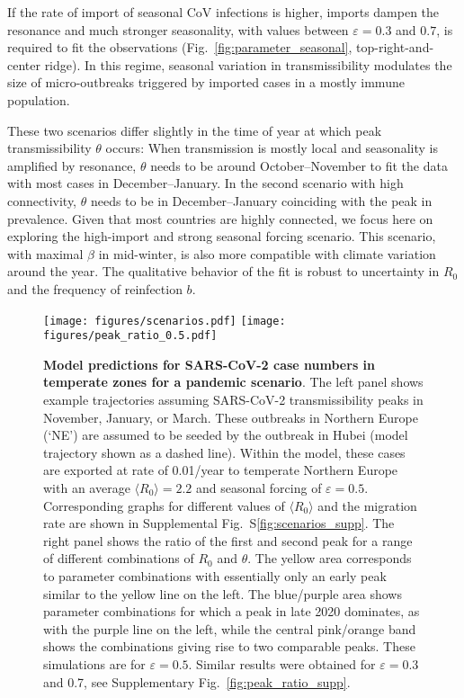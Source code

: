 \documentclass[rmp, reprint, superscriptaddress, floatfix,amsmath]{revtex4-1}
\newcommand{\forcing}{\varepsilon}
\begin{document}
If the rate of import of seasonal CoV infections is higher, imports dampen the resonance and much stronger seasonality, with values between $\forcing=0.3$ and $0.7$, is required to fit the observations (Fig.~\ref{fig:parameter_seasonal}, top-right-and-center ridge).
In this regime, seasonal variation in transmissibility modulates the size of micro-outbreaks triggered by imported cases in a mostly immune population. 

These two scenarios differ slightly in the time of year at which peak transmissibility $\theta$ occurs: 
When transmission is mostly local and seasonality is amplified by resonance, $\theta$ needs to be around October--November to fit the data with most cases in December--January. 
In the second scenario with high connectivity, $\theta$ needs to be in December--January coinciding with the peak in prevalence.
Given that most countries are highly connected, we focus here on exploring the high-import and strong seasonal forcing scenario.
This scenario, with maximal $\beta$ in mid-winter, is also more compatible with climate variation around the year.
The qualitative behavior of the fit is robust to uncertainty in $R_0$ and the frequency of reinfection $b$.


\begin{figure*}
    \centering
    \texttt{[image: figures/scenarios.pdf]}
    \texttt{[image: figures/peak\_ratio\_0.5.pdf]}
\caption{{\bf Model predictions for SARS-CoV-2 case numbers in temperate zones for a pandemic scenario}. The left panel shows example trajectories assuming SARS-CoV-2 transmissibility peaks in November, January, or March. 
These outbreaks in Northern Europe (`NE') are assumed to be seeded by the outbreak in Hubei (model trajectory shown as a dashed line).
Within the model, these cases are exported at rate of 0.01/year to temperate Northern Europe with an average $\langle R_0\rangle = 2.2$ and seasonal forcing of $\forcing=0.5$. Corresponding graphs for different values of $\langle R_0\rangle$ and the migration rate are shown in Supplemental Fig.~S\ref{fig:scenarios_supp}.
The right panel shows the ratio of the first and second peak for a range of different combinations of $R_0$ and $\theta$. 
The yellow area corresponds to parameter combinations with essentially only an early peak similar to the yellow line on the left. 
The blue/purple area shows parameter combinations for which a peak in late 2020 dominates, as with the purple line on the left, while the central pink/orange band shows the combinations giving rise to two comparable peaks. 
These simulations are for $\forcing=0.5$. Similar results were obtained for $\forcing=0.3$ and 0.7, see Supplementary  Fig.~\ref{fig:peak_ratio_supp}.}
    \label{fig:nCov_predictions}
\end{figure*}
\end{document}
